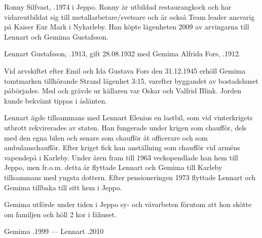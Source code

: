 


Ronny Silfvast, .1974 i Jeppo. Ronny är utbildad restaurangkock och har vidareutbildat sig till metallarbetare/svetsare och är också Team leader ansvarig på Kaiser Eur Mark i Nykarleby. Han köpte lägenheten 2009 av arvingarna till Lennart och Gemima Gustafsson.


Lennart Gustafsson, .1913, gift 28.08.1932 med Gemima Alfrida Fors, .1912.
\begin{jhchildren}
  \item {}
  \item {}
  \item {}
  \item {}
  \item {}
\end{jhchildren}
Vid arvskiftet efter Emil och Ida Gustava Fors den 31.12.1945 erhöll Gemima tomtmarken tillhörande Strand lägenhet 3:15, varefter byggandet av bostadshuset påbörjades. Med och grävde ur källaren var Oskar och Valfrid Blink. Jorden kunde bekvämt tippas i åslänten.

Lennart ägde tillsammans med Lennart Elenius en lastbil, som vid vinterkrigets utbrott rekvirerades av staten. Han fungerade under krigen som chaufför, dels med den egna bilen och senare som chaufför åt officerare och som ambulanschaufför. Efter kriget fick han anställning som chaufför vid arméns vapendepå i Karleby. Under åren fram till 1963 veckopendlade han hem till Jeppo, men fr.o.m. detta år flyttade Lennart och Gemima till Karleby tillsammans med yngsta dottern. Efter pensioneringen 1973 flyttade Lennart och Gemima tillbaka till sitt hem i Jeppo.

Gemima utförde under tiden i Jeppo sy- och vävarbeten förutom att hon skötte om familjen och höll 2 kor i fähuset.

Gemima .1999  ---  Lennart .2010



